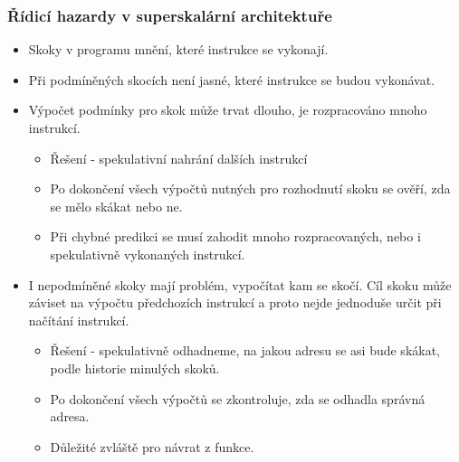 \documentclass{beamer}
\begin{document}
\begin{frame}
\frametitle{Řídicí hazardy v superskalární architektuře}

\begin{itemize}
\item Skoky v programu mnění, které instrukce se vykonají.
\item Při podmíněných skocích není jasné, které instrukce se budou vykonávat.
\item Výpočet podmínky pro skok může trvat dlouho, je rozpracováno mnoho instrukcí.
\begin{itemize}
\item Řešení - spekulativní nahrání dalších instrukcí
\item Po dokončení všech výpočtů nutných pro rozhodnutí skoku se ověří, zda se mělo skákat nebo ne.
\item Při chybné predikci se musí zahodit mnoho rozpracovaných, nebo i spekulativně vykonaných instrukcí.
\end{itemize}
\item I nepodmíněné skoky mají problém, vypočítat kam se skočí. Cíl skoku může záviset na výpočtu předchozích instrukcí a proto nejde jednoduše určit při načítání instrukcí.
\begin{itemize}
\item Řešení - spekulativně odhadneme, na jakou adresu se asi bude skákat, podle historie minulých skoků.
\item Po dokončení všech výpočtů se zkontroluje, zda se odhadla správná adresa.
\item Důležité zvláště pro návrat z funkce.
\end{itemize}
\end{itemize}

\end{frame}
\end{document}
